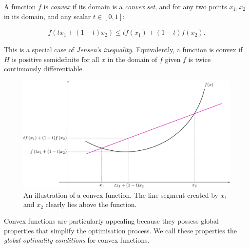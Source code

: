 
\begin{definition}

    A function $f$ is \textit{convex} if its domain is a \textit{convex set}, and for any two points $x_1, x_2$ in its domain, and any scalar $t \in [0, 1]$:

    \begin{align}

        f(t x_1 + (1-t)x_2) \leq t f(x_1) + (1-t)f(x_2).

    \end{align}

    This is a special case of \textit{Jensen's inequality}. Equivalently, a function is convex if $H$ is positive semidefinite for all $x$ in the domain of $f$ given $f$ is twice continuously differentiable.

\end{definition}




\begin{figure}[h]

    \centering

    \includegraphics[width=0.7\linewidth]{figures/2background/convex_function.svg.png}

    \caption{An illustration of a convex function. The line segment created by $x_1$ and $x_2$ clearly lies above the function.}

    \label{fig:convex_function}

\end{figure}



Convex functions are particularly appealing because they possess global properties that simplify the optimisation process. We call these properties the \textit{global optimality conditions} for convex functions.



